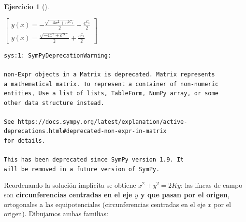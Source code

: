 \documentclass[
  spanish,
  a4paper,
]{scrreport}
\theoremstyle{definition}
\newtheorem{exercise}{Ejercicio}[chapter]
\theoremstyle{remark}
\begin{document}
\begin{exercise}[]
\begin{tcolorbox}
$\left[\begin{smallmatrix}y{\left(x \right)} = - \frac{\sqrt{- 4 x^{2} + e^{2 C_{1}}}}{2} + \frac{e^{C_{1}}}{2}\\y{\left(x \right)} = \frac{\sqrt{- 4 x^{2} + e^{2 C_{1}}}}{2} + \frac{e^{C_{1}}}{2}\end{smallmatrix}\right]$

\begin{verbatim}
sys:1: SymPyDeprecationWarning: 

non-Expr objects in a Matrix is deprecated. Matrix represents
a mathematical matrix. To represent a container of non-numeric
entities, Use a list of lists, TableForm, NumPy array, or some
other data structure instead.

See https://docs.sympy.org/latest/explanation/active-deprecations.html#deprecated-non-expr-in-matrix
for details.

This has been deprecated since SymPy version 1.9. It
will be removed in a future version of SymPy.
\end{verbatim}

Reordenando la solución implícita se obtiene \(x^2 + y^2 = 2Ky\): las
líneas de campo son \textbf{circunferencias centradas en el eje \(y\) y
que pasan por el origen}, ortogonales a las equipotenciales
(circunferencias centradas en el eje \(x\) por el origen). Dibujamos
ambas familias:


\end{tcolorbox}
\end{exercise}
\end{document}
